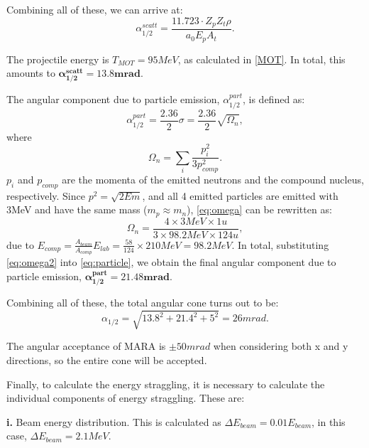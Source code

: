 Combining all of these, we can arrive at:
\begin{equation}
    \label{eq:scatter}
    \alpha_{1/2}^{scatt} = \frac{11.723\cdot Z_pZ_t\rho}{a_0E_pA_t}.
\end{equation}  

The projectile energy is $T_{MOT} = 95\unit{MeV}$, as calculated in \autoref{MOT}. In total, this amounts to $\mathbf{\alpha_{1/2}^{scatt} = 13.8\unit{\textbf{mrad}}}$.

The angular component due to particle emission, $\alpha_{1/2}^{part}$, is defined as:
\begin{equation}
    \label{eq:particle}
    \alpha_{1/2}^{part} = \frac{2.36}{2} \sigma = \frac{2.36}{2} \sqrt{\Omega_n},
\end{equation} where 
\begin{equation}
    \label{eq:omega}
    \Omega_n = \sum_i \frac{p_i^2}{3p_{comp}^2}.
\end{equation}
$p_i$ and $p_{comp}$ are the momenta of the emitted neutrons and the compound nucleus, respectively. Since $p^2 = \sqrt{2Em}$, and all 4 emitted particles are emitted with 3\unit{MeV} and have the same mass ($m_p \approx m_n$), \autoref{eq:omega} can be rewritten as:
\begin{equation}
    \label{eq:omega2}
    \Omega_n = \frac{4\times 3\unit{MeV}\times 1\unit{u}}{3\times 98.2\unit{MeV}\times 124\unit{u}},
\end{equation} due to $E_{comp} = \frac{A_{beam}}{A_{comp}}E_{lab} = \frac{58}{124}\times 210\unit{MeV} = 98.2\unit{MeV}$. In total, substituting \autoref{eq:omega2} into \ref{eq:particle}, we obtain the final angular component due to particle emission, $\mathbf{\alpha_{1/2}^{part} = 21.48\unit{\textbf{mrad}}}$.

Combining all of these, the total angular cone turns out to be:
\begin{equation}
    \label{eq:cone}
    \boxed{\alpha_{1/2} = \sqrt{13.8^2 + 21.4^2 + 5^2} =  26\unit{mrad}.}
\end{equation}

The angular acceptance of MARA is $\pm 50\unit{mrad}$ when considering both x and y directions, so the entire cone will be accepted.

Finally, to calculate the energy straggling, it is necessary to calculate the individual components of energy straggling. These are:

\textbf{i.} Beam energy distribution. This is calculated as $\Delta E_{beam} = 0.01 E_{beam}$, in this case, $\Delta E_{beam} = 2.1\unit{MeV}$.

